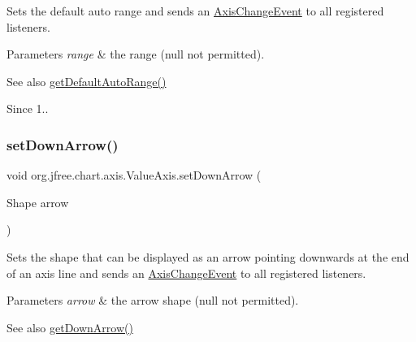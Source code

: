 Sets the default auto range and sends an \mbox{\hyperlink{}{Axis\+Change\+Event}} to all registered listeners.


\begin{DoxyParams}{Parameters}
{\em range} & the range ({\ttfamily null} not permitted).\\
\hline
\end{DoxyParams}
\begin{DoxySeeAlso}{See also}
\mbox{\hyperlink{classorg_1_1jfree_1_1chart_1_1axis_1_1_value_axis_a37169f8d6ba2253f608421b4af73155c}{get\+Default\+Auto\+Range()}}
\end{DoxySeeAlso}
\begin{DoxySince}{Since}
1.. 
\end{DoxySince}
\mbox{\label{classorg_1_1jfree_1_1chart_1_1axis_1_1_value_axis_a299e89865d4a95a60518445de0807b34}} 
\subsubsection{\texorpdfstring{set\+Down\+Arrow()}{setDownArrow()}}
{\footnotesize\ttfamily void org.\+jfree.\+chart.\+axis.\+Value\+Axis.\+set\+Down\+Arrow (\begin{DoxyParamCaption}\item[{Shape}]{arrow }\end{DoxyParamCaption})}

Sets the shape that can be displayed as an arrow pointing downwards at the end of an axis line and sends an \mbox{\hyperlink{}{Axis\+Change\+Event}} to all registered listeners.


\begin{DoxyParams}{Parameters}
{\em arrow} & the arrow shape ({\ttfamily null} not permitted).\\
\hline
\end{DoxyParams}
\begin{DoxySeeAlso}{See also}
\mbox{\hyperlink{classorg_1_1jfree_1_1chart_1_1axis_1_1_value_axis_a202802c63b8054742b83b462f2e467c7}{get\+Down\+Arrow()}} 
\end{DoxySeeAlso}
\mbox{\label{classorg_1_1jfree_1_1chart_1_1axis_1_1_value_axis_a35c73feedf55ee5dba21cd4aba5014d8}} 
